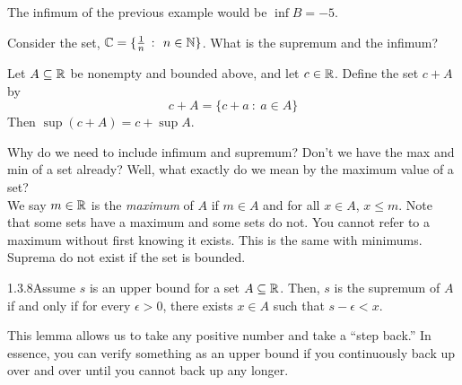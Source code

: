 The infimum of the previous example would be $\inf B = -5$.

\begin{example}
    {}Consider the set, $\C = \{\frac{1}{n} \ \colon \ n \in \N\}$. What is the supremum and the infimum?
\end{example}


\begin{example}
    Let $A \subseteq \mathbb{R}$ be nonempty and bounded above, and let $c \in \mathbb{R}$. Define the set $c + A$ by $$c + A = \{c+a \ \colon \ a \in A\}$$ Then $\sup(c + A) = c + \sup A$.
\end{example}


Why do we need to include infimum and supremum? Don't we have the max and min of a set already? Well, what exactly do we mean by the \gls{maximum value} of a set? \\

We say $m \in \mathbb{R}$ is the \textit{maximum} of $A$ if $m \in A$ and for all $x\in A$, $x \leq m$. Note that some sets have a maximum and some sets do not. You cannot refer to a maximum without first knowing it exists. This is the same with minimums. Suprema do not exist if the set is bounded.

\begin{lemma}
    {1.3.8}Assume $s$ is an \gls{upper bound} for a set $A \subseteq \mathbb{R}$. Then, $s$ is the supremum of $A$ if and only if for every $\epsilon > 0$, there exists $x\in A$ such that $s - \epsilon < x$.
\end{lemma}

This lemma allows us to take any positive number and take a ``step back.'' In essence, you can verify something as an upper bound if you continuously back up over and over until you cannot back up any longer.

